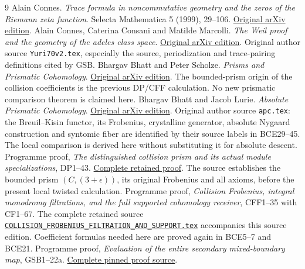 \documentclass[11pt,a4paper]{article}
\begin{document}
\begin{thebibliography}{9}
 Alain Connes.
\emph{Trace formula in noncommutative geometry and the zeros of the
Riemann zeta function}. Selecta Mathematica 5 (1999), 29--106.
\href{https://arxiv.org/abs/math/9811068v1}{Original arXiv edition}.
 Alain Connes, Caterina Consani and Matilde Marcolli.
\emph{The Weil proof and the geometry of the adeles class space}.
\href{https://arxiv.org/abs/math/0703392v1}{Original arXiv edition}.
Original author source \texttt{Yuri70v2.tex}, especially the source,
periodization and trace-pairing definitions cited by GSB.
 Bhargav Bhatt and Peter Scholze.
\emph{Prisms and Prismatic Cohomology}.
\href{https://arxiv.org/abs/1905.08229v4}{Original arXiv edition}.
The bounded-prism origin of the collision coefficients is the
previous DP/CFF calculation. No new prismatic comparison theorem
is claimed here.
 Bhargav Bhatt and Jacob Lurie.
\emph{Absolute Prismatic Cohomology}.
\href{https://arxiv.org/abs/2201.06120v1}{Original arXiv edition}.
Original author source \texttt{apc.tex}: the Breuil--Kisin
functor, its Frobenius, crystalline generator, absolute
Nygaard construction and syntomic fiber are identified by
their source labels in BCE29--45. The local comparison
is derived here without substituting it for absolute descent.
 Programme proof,
\emph{The distinguished collision prism and its actual module
specializations}, DP1--43.
\href{DISTINGUISHED_COLLISION_PRISM_DERIVATION.md}
{Complete retained proof}. The source establishes the bounded
prism \((C,(3+\epsilon))\), its original Frobenius and all
axioms, before the present local twisted calculation.
 Programme proof,
\emph{Collision Frobenius, integral monodromy filtrations, and the
full supported cohomology receiver}, CFF1--35 with CF1--67.
The complete retained source
\href{COLLISION_FROBENIUS_FILTRATION_AND_SUPPORT.tex}
{\texttt{COLLISION\_FROBENIUS\_FILTRATION\_AND\_SUPPORT.tex}}
accompanies this source edition. Coefficient formulas needed here
are proved again in BCE5--7 and BCE21.
 Programme proof,
\emph{Evaluation of the entire secondary mixed-boundary map},
GSB1--22a.
\href{https://github.com/KokunoYumeto/zeta-function-research-reader/blob/7bb431df02b42681b3c7335fbf272a3771f777ef/workbenches/splitzero-tandem/research-self-audit/supporting_proofs/GLOBAL_SECONDARY_BOUNDARY_EVALUATION.tex}
{Complete pinned proof source}.
\end{thebibliography}
\end{document}
